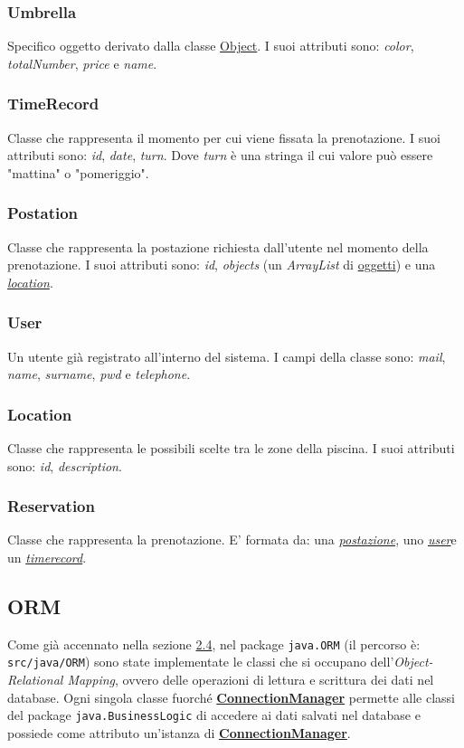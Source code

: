 \documentclass{article}
\begin{document}
\subsubsection{Umbrella}\label{subsubsec:umbrella}
Specifico oggetto derivato dalla classe \hyperref[subsubsec:object]{Object}. I suoi attributi sono: \textit{color},  \textit{totalNumber}, \textit{price} e \textit{name}.
\subsubsection{TimeRecord}\label{subsubsec:timerecord}
Classe che rappresenta il momento per cui viene fissata la prenotazione. I suoi attributi sono: \textit{id}, \textit{date}, \textit{turn}. Dove \textit{turn} è una stringa il cui valore può essere "mattina" o "pomeriggio".
\subsubsection{Postation}\label{subsubsec:postation}
Classe che rappresenta la postazione richiesta dall'utente nel momento della prenotazione. I suoi attributi sono: \textit{id}, \textit{objects} (un \textit{ArrayList} di \hyperref[subsubsec:object]{oggetti}) e una \hyperref[subsubsec:Location]{\textit{location}}.
\subsubsection{User}\label{subsubsec:user}
Un utente già registrato all'interno del sistema. I campi della classe sono: \textit{mail}, \textit{name}, \textit{surname}, \textit{pwd} e \textit{telephone}.
\subsubsection{Location}\label{subsubsec:Location}
Classe che rappresenta le possibili scelte tra le zone della piscina. I suoi attributi sono: \textit{id}, \textit{description}.
\subsubsection{Reservation}\label{subsubsec:reservation}
Classe che rappresenta la prenotazione. E' formata da: una \hyperref[subsubsec:postation]{\textit{postazione}}, uno \hyperref[subsubsec:user]{\textit{user}}e un \hyperref[subsubsec:timerecord]{\textit{timerecord}}.
\subsection{ORM}\label{subsec:ORM}
Come già accennato nella sezione \hyperref[subsec:class-diagram]{2.4}, nel package \texttt{java.ORM} (il percorso è: \\ \texttt{src/java/ORM})
            sono state implementate le classi che si occupano dell'\textit{Object-Relational Mapping}, ovvero delle  operazioni di lettura e scrittura dei dati nel database.
            Ogni singola classe fuorché \hyperref[subsubsec:connectionmanager]{\textbf{ConnectionManager}} permette alle classi del package \texttt{java.BusinessLogic} di accedere ai dati salvati nel database e possiede come attributo un'istanza di \hyperref[subsubsec:connectionmanager]{\textbf{ConnectionManager}}.
            
\end{document}

